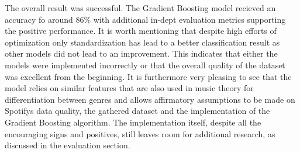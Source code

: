 The overall result was successful. The Gradient Boosting model recieved an accuracy fo around 86\% with additional in-dept evaluation metrics supporting the
positive performance. It is worth mentioning that despite high efforts of optimization only standardization has lead to a better classification result as other models 
did not lead to an improvement. This indicates that either the models were implemented incorrectly or that the overall quality of the dataset was excellent from the 
beginning. It is furthermore very pleasing to see that the model relies 
on similar features that are also used in music theory for differentiation between genres and allows affirmatory assumptions to be made on Spotifys data quality, the gathered dataset 
and the implementation of the Gradient Boosting algorithm. 
The implementation itself, despite all the encouraging signs and positives, still leaves room for additional research, as discussed in the evaluation section.

